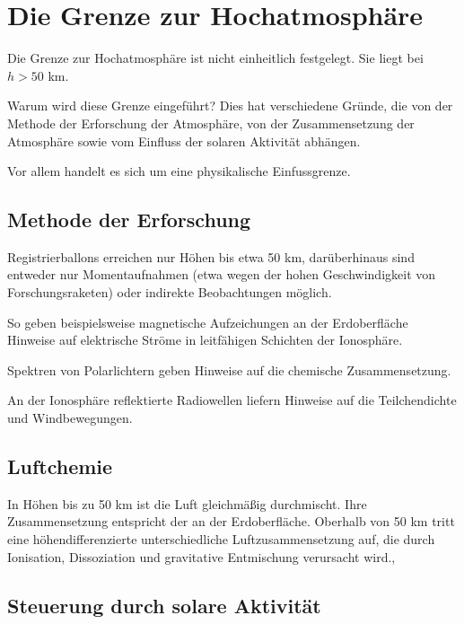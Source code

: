 \documentclass[
  a4paper,
  DIV=11]{scrreprt}
\begin{document}
\hypertarget{die-grenze-zur-hochatmosphuxe4re}{%
\section{Die Grenze zur
Hochatmosphäre}\label{die-grenze-zur-hochatmosphuxe4re}}

Die Grenze zur Hochatmosphäre ist nicht einheitlich festgelegt. Sie
liegt bei \(h > 50\) km.

Warum wird diese Grenze eingeführt? Dies hat verschiedene Gründe, die
von der Methode der Erforschung der Atmosphäre, von der Zusammensetzung
der Atmosphäre sowie vom Einfluss der solaren Aktivität abhängen.

Vor allem handelt es sich um eine physikalische Einfussgrenze.

\hypertarget{methode-der-erforschung}{%
\subsection{Methode der Erforschung}\label{methode-der-erforschung}}

Registrierballons erreichen nur Höhen bis etwa 50 km, darüberhinaus sind
entweder nur Momentaufnahmen (etwa wegen der hohen Geschwindigkeit von
Forschungsraketen) oder indirekte Beobachtungen möglich.

So geben beispielsweise magnetische Aufzeichungen an der Erdoberfläche
Hinweise auf elektrische Ströme in leitfähigen Schichten der Ionosphäre.

Spektren von Polarlichtern geben Hinweise auf die chemische
Zusammensetzung.

An der Ionosphäre reflektierte Radiowellen liefern Hinweise auf die
Teilchendichte und Windbewegungen.

\hypertarget{luftchemie}{%
\subsection{Luftchemie}\label{luftchemie}}

In Höhen bis zu 50 km ist die Luft gleichmäßig durchmischt. Ihre
Zusammensetzung entspricht der an der Erdoberfläche. Oberhalb von 50 km
tritt eine höhendifferenzierte unterschiedliche Luftzusammensetzung auf,
die durch Ionisation, Dissoziation und gravitative Entmischung
verursacht wird.,

\hypertarget{steuerung-durch-solare-aktivituxe4t}{%
\subsection{Steuerung durch solare
Aktivität}\label{steuerung-durch-solare-aktivituxe4t}}
\end{document}
